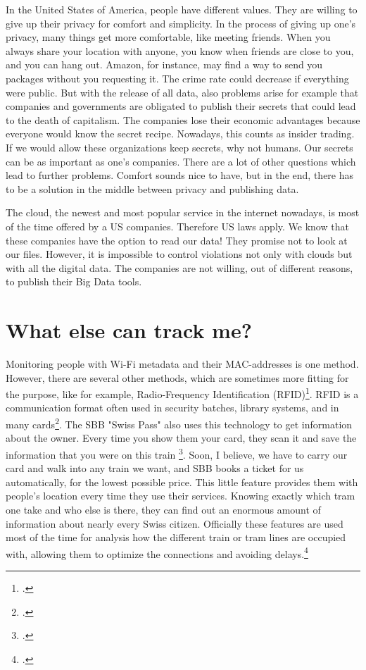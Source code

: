 \documentclass[paper=a4, fontsize=11pt]{article}
\begin{document}
In the United States of America, people have different values. They are willing to give up their privacy for comfort and simplicity. In the process of giving up one's privacy, many things get more comfortable, like meeting friends. When you always share your location with anyone, you know when friends are close to you, and you can hang out. Amazon, for instance, may find a way to send you packages without you requesting it. The crime rate could decrease if everything were public. But with the release of all data, also problems arise for example that companies and governments are obligated to publish their secrets that could lead to the death of capitalism. The companies lose their economic advantages because everyone would know the secret recipe. Nowadays, this counts as insider trading. If we would allow these organizations keep secrets, why not humans. Our secrets can be as important as one's companies. There are a lot of other questions which lead to further problems.
Comfort sounds nice to have, but in the end, there has to be a solution in the middle between privacy and publishing data.

The cloud, the newest and most popular service in the internet nowadays, is most of the time offered by a US companies. Therefore US laws apply. We know that these companies have the option to read our data! They promise not to look at our files. However, it is impossible to control violations not only with clouds but with all the digital data. The companies are not willing, out of different reasons, to publish their Big Data tools.

\section{What else can track me?}
Monitoring people with Wi-Fi metadata and their MAC-addresses is one method. However, there are several other methods, which are sometimes more fitting for the purpose, like for example, Radio-Frequency Identification (RFID)\footcite{studenttracking}. RFID is a communication format often used in security batches, library systems, and in many cards\footcite{datenschutzrfid}. The SBB "Swiss Pass" also uses this technology to get information about the owner. Every time you show them your card, they scan it and save the information that you were on this train \footcite{sbbdatenschutz}. Soon, I believe, we have to carry our card and walk into any train we want, and SBB books a ticket for us automatically, for the lowest possible price. This little feature provides them with people's location every time they use their services. Knowing exactly which tram one take and who else is there, they can find out an enormous amount of information about nearly every Swiss citizen. Officially these features are used most of the time for analysis how the different train or tram lines are occupied with, allowing them to optimize the connections and avoiding delays.\footcite{miningtransport}
\end{document}
